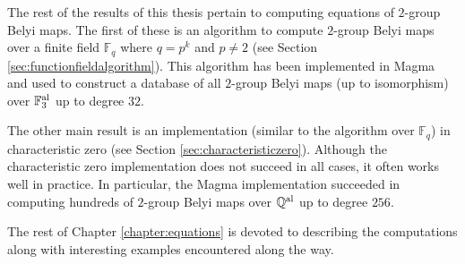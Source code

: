 \documentclass{dcthesis}
\newcommand{\QQal}{{\mathbb Q}^{\textup{al}}}
\newcommand{\FF}{\mathbb{F}}
\numberwithin{equation}{section}
\theoremstyle{definition}
\theoremstyle{remark}
\begin{document}
{{{    %
    The rest of the results of this thesis
    pertain to computing equations
    of $2$-group Belyi maps.
    The first of these is an algorithm
    to compute $2$-group Belyi maps
    over a finite field $\FF_q$
    where $q=p^k$ and $p\neq 2$
    (see Section \ref{sec:functionfieldalgorithm}).
    This algorithm has been implemented in
    \textsf{Magma}
    and used to construct a database
    of all $2$-group Belyi maps
    (up to isomorphism)
    over
    $\FF_3^\textup{al}$
    up to degree $32$.
    \par
    The other main result is an implementation
    (similar to the algorithm over 
    $\FF_q$)
    in characteristic zero
    (see Section
    \ref{sec:characteristiczero}).
    Although the characteristic zero
    implementation does not succeed in all cases,
    it often works well in practice.
    In particular,
    the \textsf{Magma} implementation succeeded
    in computing hundreds of $2$-group Belyi maps
    over $\QQal$ up to degree $256$.
    \par
    The rest of Chapter \ref{chapter:equations}
    is devoted to describing the computations
    along with interesting examples
    encountered along the way.
  }
}}
\end{document}
